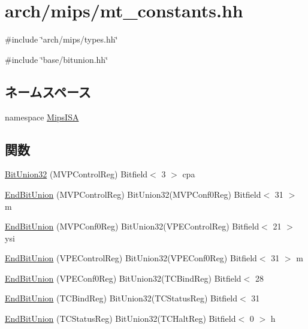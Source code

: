 \hypertarget{mips_2mt__constants_8hh}{
\section{arch/mips/mt\_\-constants.hh}
\label{mips_2mt__constants_8hh}
}
{\ttfamily \#include \char`\"{}arch/mips/types.hh\char`\"{}}\par
{\ttfamily \#include \char`\"{}base/bitunion.hh\char`\"{}}\par
\subsection*{ネームスペース}
\begin{DoxyCompactItemize}
\item 
namespace \hyperlink{namespaceMipsISA}{MipsISA}
\end{DoxyCompactItemize}
\subsection*{関数}
\begin{DoxyCompactItemize}
\item 
\hyperlink{namespaceMipsISA_a9c38a1dd425d938646c1e57e919ee830}{BitUnion32} (MVPControlReg) Bitfield$<$ 3 $>$ cpa
\item 
\hyperlink{namespaceMipsISA_ad4fdd9ff9306f98fd1cb2811a1ee108f}{EndBitUnion} (MVPControlReg) BitUnion32(MVPConf0Reg) Bitfield$<$ 31 $>$ m
\item 
\hyperlink{namespaceMipsISA_aeff4cebcd774805b052a6d3eaae89d36}{EndBitUnion} (MVPConf0Reg) BitUnion32(VPEControlReg) Bitfield$<$ 21 $>$ ysi
\item 
\hyperlink{namespaceMipsISA_a87885d433cae4e0f9f50680dd02bd7df}{EndBitUnion} (VPEControlReg) BitUnion32(VPEConf0Reg) Bitfield$<$ 31 $>$ m
\item 
\hyperlink{namespaceMipsISA_acdeb651bae709ddc62e0641544f676e8}{EndBitUnion} (VPEConf0Reg) BitUnion32(TCBindReg) Bitfield$<$ 28
\item 
\hyperlink{namespaceMipsISA_a1c829af5069f0e961b7356026c2f45db}{EndBitUnion} (TCBindReg) BitUnion32(TCStatusReg) Bitfield$<$ 31
\item 
\hyperlink{namespaceMipsISA_a6d539c3ccb9c2c4a1092d245f21830ad}{EndBitUnion} (TCStatusReg) BitUnion32(TCHaltReg) Bitfield$<$ 0 $>$ h
\end{DoxyCompactItemize}
